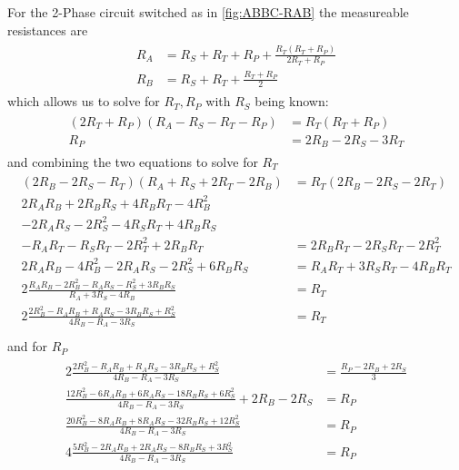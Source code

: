 \documentclass[12pt,a4paper,oneside,openany]{article}
\begin{document}
For the 2-Phase circuit switched as in \cref{fig:ABBC-RAB} the measureable resistances are
\begin{gather}
\begin{aligned}
R_A &= R_S + R_T + R_P + \frac{R_T (R_T + R_P)}{2 R_T + R_P} \\
R_B &= R_S + R_T + \frac{R_T + R_P}{2}
\end{aligned}
\end{gather}
which allows us to solve for $R_T, R_P$ with $R_S$ being known:
\begin{gather}
\begin{aligned}
(2 R_T + R_P) (R_A - R_S - R_T - R_P) &= R_T (R_T + R_P) \\
R_P &= 2 R_B - 2 R_S - 3 R_T
\end{aligned}
\end{gather}
and combining the two equations to solve for $R_T$
\begin{gather}
\begin{aligned}
(2 R_B - 2 R_S - R_T) (R_A + R_S + 2 R_T - 2 R_B) &= R_T (2 R_B - 2 R_S - 2 R_T) \\
2 R_A R_B + 2 R_B R_S + 4 R_B R_T - 4 R_B^2 \\
 - 2 R_A R_S - 2 R_S^2 - 4 R_S R_T + 4 R_B R_S\\
 - R_A R_T - R_S R_T - 2 R_T^2 + 2R_B R_T &= 2 R_B R_T - 2 R_S R_T - 2 R_T^2 \\
2 R_A R_B - 4 R_B^2 - 2 R_A R_S - 2 R_S^2 + 6 R_B R_S &= R_A R_T + 3 R_S R_T - 4 R_B R_T\\
2 \frac{ R_A R_B - 2 R_B^2 - R_A R_S - R_S^2 + 3 R_B R_S}{R_A + 3 R_S- 4 R_B} &= R_T\\
2 \frac{ 2 R_B^2 - R_A R_B  + R_A R_S - 3 R_B R_S + R_S^2}{4 R_B - R_A - 3 R_S} &= R_T\\
\end{aligned}
\end{gather}
and for $R_P$
\begin{gather}
\begin{aligned}
2 \frac{ 2 R_B^2 - R_A R_B  + R_A R_S - 3 R_B R_S + R_S^2}{4 R_B - R_A - 3 R_S} &= \frac{R_P - 2 R_B + 2 R_S}{3} \\
\frac{ 12 R_B^2 - 6 R_A R_B  + 6 R_A R_S - 18 R_B R_S + 6 R_S^2}{4 R_B - R_A - 3 R_S} + 2 R_B - 2 R_S &= R_P \\
\frac{ 20 R_B^2 - 8 R_A R_B  + 8 R_A R_S - 32 R_B R_S + 12 R_S^2}{4 R_B - R_A - 3 R_S} &= R_P \\
4 \frac{ 5 R_B^2 - 2 R_A R_B  + 2 R_A R_S - 8 R_B R_S + 3 R_S^2}{4 R_B - R_A - 3 R_S} &= R_P
\end{aligned}
\end{gather}

\nocite{*}

%
%
\printbibliography
\end{document}
